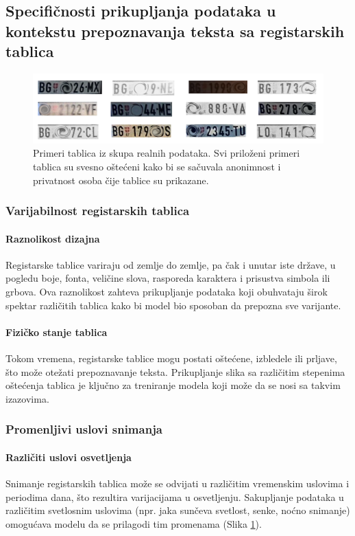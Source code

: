 \documentclass[a4paper,12pt]{article}
\begin{document}
	\subsection{Specifičnosti prikupljanja podataka u kontekstu prepoznavanja teksta sa registarskih tablica}
	\begin{figure}[H]
		\centering
		\includegraphics[width=\textwidth]{assets/license-plate-samples.png}
		\caption{Primeri tablica iz skupa realnih podataka. Svi priloženi primeri tablica su svesno oštećeni kako bi se sačuvala anonimnost i privatnost osoba čije tablice su prikazane.}
		\label{fig:license-plate-samples}
	\end{figure}
	
	\subsubsection{Varijabilnost registarskih tablica}
	\paragraph{Raznolikost dizajna}
	Registarske tablice variraju od zemlje do zemlje, pa čak i unutar iste države, u pogledu boje, fonta, veličine slova, rasporeda karaktera i prisustva simbola ili grbova. Ova raznolikost zahteva prikupljanje podataka koji obuhvataju širok spektar različitih tablica kako bi model bio sposoban da prepozna sve varijante.
	
	\paragraph{Fizičko stanje tablica}
	Tokom vremena, registarske tablice mogu postati oštećene, izbledele ili prljave, što može otežati prepoznavanje teksta. Prikupljanje slika sa različitim stepenima oštećenja tablica je ključno za treniranje modela koji može da se nosi sa takvim izazovima.
	
	\subsubsection{Promenljivi uslovi snimanja}
	\paragraph{Različiti uslovi osvetljenja}
	Snimanje registarskih tablica može se odvijati u različitim vremenskim uslovima i periodima dana, što rezultira varijacijama u osvetljenju. Sakupljanje podataka u različitim svetlosnim uslovima (npr. jaka sunčeva svetlost, senke, noćno snimanje) omogućava modelu da se prilagodi tim promenama (Slika \ref{fig:license-plate-samples}).
	
\end{document}
